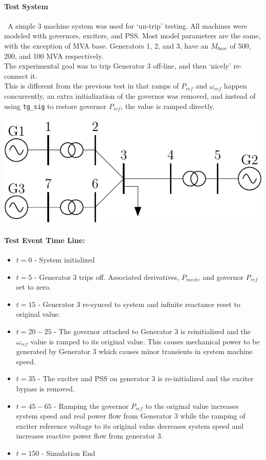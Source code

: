 \documentclass[12pt]{article}
\begin{document}
\onehalfspacing

\paragraph{Test System}\ A simple 3 machine system was used for `un-trip' testing.
All machines were modeled with governors, exciters, and PSS.
Most model parameters are the same, with the exception of MVA base.
Generators 1, 2, and 3, have an $M_{base}$ of 500, 200, and 100 MVA respectively. \\
The experimental goal was to trip Generator 3 off-line, and then `nicely' re-connect it.\\

This is different from the previous test in that ramps of $P_{ref}$ and $\omega_{ref}$ happen concurrently, an extra initialization of the governor was removed, and instead of using \verb|tg_sig| to restore governor $P_{ref}$, the value is ramped directly.

\begin{center}
\includegraphics[width=.6\linewidth]{200831-3mach7bus}
\end{center}

\paragraph{Test Event Time Line:}
\begin{itemize}
 em
\item $t=0$ - System initialized
\item $t=5$ - Generator 3 trips off.
Associated derivatives, $P_{mech}$, and governor $P_{ref}$ set to zero.
\item $t=15$ - Generator 3 re-synced to system and infinite reactance reset to original value. 

\item $t=20-25$ - The governor attached to Generator 3 is reinitialized and the $\omega_{ref}$ value is ramped to its original value. 
This causes mechanical power to be generated by Generator 3 which causes minor transients in system machine speed.
\item $t=35$ - The exciter and PSS on generator 3 is re-initialized and the exciter bypass is removed.
\item $t=45-65$ - Ramping the governor $P_{ref}$ to the original value increases system speed  and real power flow from Generator 3 while the ramping of exciter reference voltage to its original value decreases system speed and increases reactive power flow from generator 3.
\item $t=150$ - Simulation End
\end{itemize}
\end{document}
